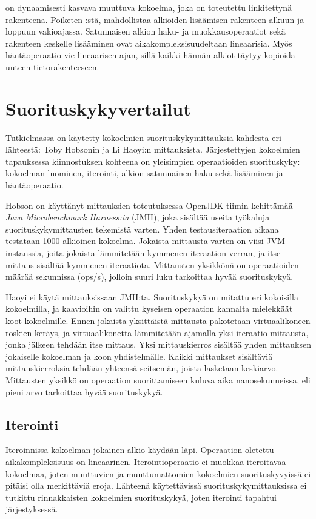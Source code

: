  on dynaamisesti kasvava muuttuva kokoelma, joka on toteutettu linkitettynä rakenteena. Poiketen :stä,  mahdollistaa alkioiden lisäämisen rakenteen alkuun ja loppuun vakioajassa. Satunnaisen alkion haku- ja muokkausoperaatiot sekä rakenteen keskelle lisääminen ovat aikakompleksisuudeltaan lineaarisia. Myös häntäoperaatio vie lineaarisen ajan, sillä kaikki hännän alkiot täytyy kopioida uuteen tietorakenteeseen.
\cite{scalaCollections}


\section{Suorituskykyvertailut}
Tutkielmassa on käytetty kokoelmien suorituskykymittauksia kahdesta eri lähteestä: Toby Hobsonin\cite{hobsonBenchmark} ja Li Haoyi:n\cite{haoyiBenchmark} mittauksista. Järjestettyjen kokoelmien tapauksessa kiinnostuksen kohteena on yleisimpien operaatioiden suorituskyky: kokoelman luominen, iterointi, alkion satunnainen haku sekä lisääminen ja häntäoperaatio. 

Hobson\cite{hobsonBenchmark} on käyttänyt mittauksien toteutuksessa OpenJDK-tiimin kehittämää \textit{Java Microbenchmark Harness:ia} (JMH), joka sisältää useita työkaluja suorituskykymittausten tekemistä varten. Yhden testausiteraation aikana testataan 1000-alkioinen kokoelma. Jokaista mittausta varten on viisi JVM-instanssia, joita jokaista lämmitetään kymmenen iteraation verran, ja itse mittaus sisältää kymmenen iteraatiota. Mittausten yksikkönä on operaatioiden määrää sekunnissa (ops/s), jolloin suuri luku tarkoittaa hyvää suorituskykyä.
\cite{highPerformanceProgramming}

Haoyi ei käytä mittauksissaan\cite{haoyiBenchmark} JMH:ta. Suorituskykyä on mitattu eri kokoisilla kokoelmilla, ja kaavioihin on valittu kyseisen operaation kannalta mielekkäät koot kokoelmille. Ennen jokaista yksittäistä mittausta pakotetaan virtuaalikoneen roskien keräys, ja virtuaalikonetta lämmitetään ajamalla yksi iteraatio mittausta, jonka jälkeen tehdään itse mittaus. Yksi mittauskierros sisältää yhden mittauksen jokaiselle kokoelman ja koon yhdistelmälle. Kaikki mittaukset sisältäviä mittauskierroksia tehdään yhteensä seitsemän, joista lasketaan keskiarvo. Mittausten yksikkö on operaation suorittamiseen kuluva aika nanosekunneissa, eli pieni arvo tarkoittaa hyvää suorituskykyä. 


\subsection{Iterointi}
Iteroinnissa kokoelman jokainen alkio käydään läpi. Operaation oletettu aikakompleksisuus on lineaarinen. Iterointioperaatio ei muokkaa iteroitavaa kokoelmaa, joten muuttuvien ja muuttumattomien kokoelmien suorituskyvyissä ei pitäisi olla merkittäviä eroja. Lähteenä käytettävissä suorituskykymittauksissa ei tutkittu rinnakkaisten kokoelmien suorituskykyä, joten iterointi tapahtui järjestyksessä.

